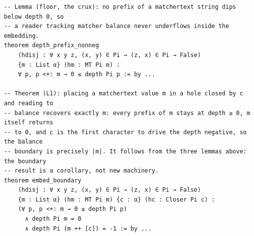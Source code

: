 \begin{lstlisting}
-- Lemma (floor, the crux): no prefix of a matchertext string dips below depth 0, so
-- a reader tracking matcher balance never underflows inside the embedding.
theorem depth_prefix_nonneg
    (hdisj : ∀ x y z, (x, y) ∈ Pi → (z, x) ∈ Pi → False)
    {m : List α} (hm : MT Pi m) :
    ∀ p, p <+: m → 0 ≤ depth Pi p := by ...

-- Theorem (L1): placing a matchertext value m in a hole closed by c and reading to
-- balance recovers exactly m: every prefix of m stays at depth ≥ 0, m itself returns
-- to 0, and c is the first character to drive the depth negative, so the balance
-- boundary is precisely |m|. It follows from the three lemmas above: the boundary
-- result is a corollary, not new machinery.
theorem embed_boundary
    (hdisj : ∀ x y z, (x, y) ∈ Pi → (z, x) ∈ Pi → False)
    {m : List α} (hm : MT Pi m) {c : α} (hc : Closer Pi c) :
    (∀ p, p <+: m → 0 ≤ depth Pi p)
      ∧ depth Pi m = 0
      ∧ depth Pi (m ++ [c]) = -1 := by ...
\end{lstlisting}